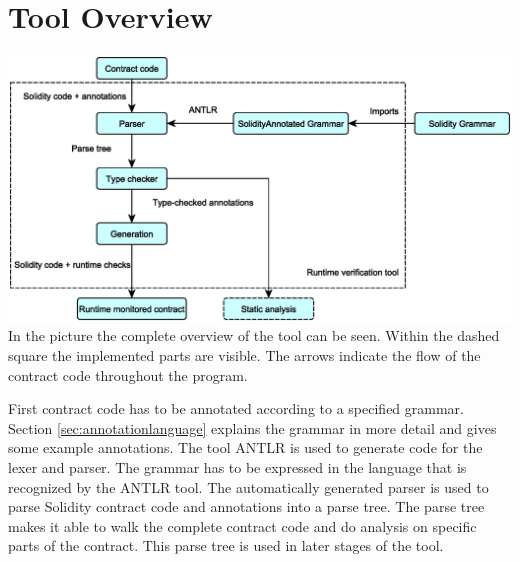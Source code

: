 \documentclass[a4paper]{article}
\begin{document}
\section{Tool Overview}
\includegraphics[width=\textwidth,height=\textheight,keepaspectratio]{resources/ToolOverview.eps} 
In the picture the complete overview of the tool can be seen. Within the dashed square the implemented parts are visible. The arrows indicate the flow of the contract code throughout the program. \par
First contract code has to be annotated according to a specified grammar. Section \ref{sec:annotationlanguage} explains the grammar in more detail and gives some example annotations. The tool ANTLR \cite{parr2013definitive} is used to generate code for the lexer and parser. The grammar has to be expressed in the language that is recognized by the ANTLR tool. The automatically generated parser is used to parse Solidity contract code and annotations into a parse tree. The parse tree makes it able to walk the complete contract code and do analysis on specific parts of the contract. This parse tree is used in later stages of the tool. \par
\end{document}
